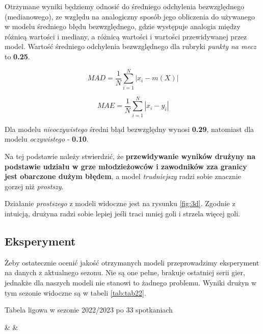 \documentclass{article}
\begin{document}
Otrzymane wyniki będziemy odnosić do średniego odchylenia bezwzględnego (medianowego), ze względu na analogiczny sposób jego obliczenia do używanego w modelu średniego błędu bezwzględnego, gdzie występuje analogia między różnicą wartości i mediany, a różnicą wartości i wartości przewidywanej przez model. Wartość średniego odchylenia bezwzględnego dla rubryki \textit{punkty na mecz} to \textbf{0.25}.

\begin{equation}\label{eq:mad}
MAD={\frac{1}{N}\sum\limits_{i=1}^N |x_i - m(X)|}
\end{equation}

\begin{equation}\label{eq:mae}
MAE={\frac{1}{N}\sum\limits_{i=1}^N |x_i - y_i|}
\end{equation}

Dla modelu \textit{nieoczywistego} średni błąd bezwzględny wynosi \textbf{0.29}, natomiast dla modelu \textit{oczywistego} - \textbf{0.10}.

Na tej podstawie należy stwierdzić, że \textbf{przewidywanie wyników drużyny na podstawie udziału w grze młodzieżowców i zawodników zza granicy jest obarczone dużym błędem}, a model \textit{trudniejszy} radzi sobie znacznie gorzej niż \textit{prostszy}.

Działanie \textit{prostszego} z modeli widoczne jest na rysunku \ref{fig:3d}. Zgodnie z intuicją, drużyna radzi sobie lepiej jeśli traci mniej goli i strzela więcej goli.



\subsection{Eksperyment}

Żeby ostatecznie ocenić jakość otrzymanych modeli przeprowadzimy eksperyment na danych z aktualnego sezonu. Nie są one pełne, brakuje ostatniej serii gier, jednakże dla naszych modeli nie stanowi to żadnego problemu. Wyniki drużyn w tym sezonie widoczne są w tabeli \ref{tab:tab22}.

\begin{table}[h!]
\centering
\caption{Tabela ligowa w sezonie 2022/2023 po 33 spotkaniach}
\label{tab:tab22}
{\csvcolii & \csvcoliii & \csvcoliv}
\end{table}
\end{document}
